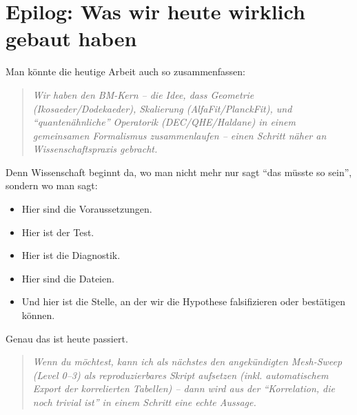 \documentclass[11pt,a4paper]{article}
\begin{document}
\section*{Epilog: Was wir heute wirklich gebaut haben}

Man könnte die heutige Arbeit auch so zusammenfassen:

\begin{quote}
\emph{Wir haben den BM-Kern -- die Idee, dass Geometrie (Ikosaeder/Dodekaeder), Skalierung (AlfaFit/PlanckFit), und ``quantenähnliche'' Operatorik (DEC/QHE/Haldane) in einem gemeinsamen Formalismus zusammenlaufen -- einen Schritt näher an Wissenschaftspraxis gebracht.}
\end{quote}

Denn Wissenschaft beginnt da, wo man nicht mehr nur sagt ``das müsste so sein'', sondern wo man sagt:
\begin{itemize}[leftmargin=*,itemsep=0.5em]
    \item Hier sind die Voraussetzungen.
    \item Hier ist der Test.
    \item Hier ist die Diagnostik.
    \item Hier sind die Dateien.
    \item Und hier ist die Stelle, an der wir die Hypothese falsifizieren oder bestätigen können.
\end{itemize}

Genau das ist heute passiert.

\begin{quote}
\emph{Wenn du möchtest, kann ich als nächstes den angekündigten Mesh-Sweep (Level 0--3) als reproduzierbares Skript aufsetzen (inkl. automatischem Export der korrelierten Tabellen) -- dann wird aus der ``Korrelation, die noch trivial ist'' in einem Schritt eine echte Aussage.}
\end{quote}
\end{document}
